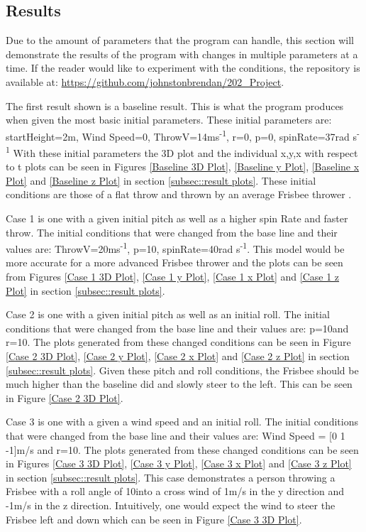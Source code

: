 \documentclass[12pt,twoside,letterpaper]{article}
\begin{document}
\begin{multicols}{2}
\section{Results}
Due to the amount of parameters that the program can handle, this section will demonstrate the results of the program with changes in multiple parameters at a time. If the reader would like to experiment with the conditions, the repository is available at: \url{https://github.com/johnstonbrendan/202_Project}.
\par
The first result shown is a baseline result. This is what the program produces when given the most basic initial parameters. These initial parameters are:
startHeight=2m, Wind Speed=0, ThrowV=14ms\textsuperscript{-1}, r=0, p=0, spinRate=37rad s\textsuperscript{-1}
With these initial parameters the 3D plot and the individual x,y,x with respect to t plots can be seen in Figures \ref{Baseline 3D Plot}, \ref{Baseline y Plot}, \ref{Baseline x Plot} and \ref{Baseline z Plot} in section \ref{subsec::result plots}. These initial conditions are those of a flat throw and thrown by an average Frisbee thrower \cite{Morrison2005}.
\par
\par
Case 1 is one with a given initial pitch as well as a higher spin Rate and faster throw. The initial conditions that were changed from the base line and their values are: ThrowV=20ms\textsuperscript{-1}, p=10\degree , spinRate=40rad s\textsuperscript{-1}.
This model would be more accurate for a more advanced Frisbee thrower and the plots can be seen from Figures \ref{Case 1 3D Plot}, \ref{Case 1 y Plot}, \ref{Case 1 x Plot} and \ref{Case 1 z Plot} in section \ref{subsec::result plots}.
\par
Case 2 is one with a given initial pitch as well as an initial roll. The initial conditions that were changed from the base line and their values are: p=10\degree and r=10\degree. The plots generated from these changed conditions can be seen in Figure \ref{Case 2 3D Plot}, \ref{Case 2 y Plot}, \ref{Case 2 x Plot} and \ref{Case 2 z Plot} in section \ref{subsec::result plots}. Given these pitch and roll conditions, the Frisbee should be much higher than the baseline did and slowly steer to the left. This can be seen in Figure \ref{Case 2 3D Plot}.
\par
Case 3 is one with a given a wind speed and an initial roll. The initial conditions that were changed from the base line and their values are: Wind Speed = [0 1 -1]m/s and r=10\degree. The plots generated from these changed conditions can be seen in Figures \ref{Case 3 3D Plot}, \ref{Case 3 y Plot}, \ref{Case 3 x Plot} and \ref{Case 3 z Plot} in section \ref{subsec::result plots}. This case demonstrates a person throwing a Frisbee with a roll angle of 10\degree into a cross wind of 1m/s in the y direction and -1m/s in the z direction. Intuitively, one would expect the wind to steer the Frisbee left and down which can be seen in Figure \ref{Case 3 3D Plot}.

\end{multicols}
\end{document}

